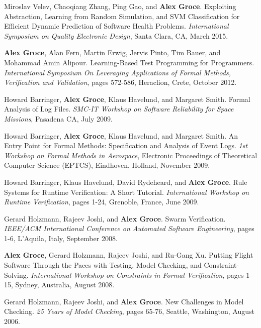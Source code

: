 \documentclass[ComputerScience]{vita}
\begin{document}
\begin{vita}
\begin{Invited Papers}
\item Miroslav Velev, Chaoqiang Zhang, Ping Gao, and {\bf Alex Groce}.
\newblock Exploiting Abstraction, Learning from Random Simulation, and SVM Classification for Efficient Dynamic Prediction of Software Health Problems.
\newblock \emph{International Symposium on Quality Electronic Design}, Santa Clara, CA, March 2015.

\item {\bf Alex Groce}, Alan Fern, Martin Erwig, Jervis Pinto, Tim Bauer, and Mohammad Amin Alipour.
\newblock Learning-Based Test Programming for Programmers.
\newblock \emph{International Symposium On Leveraging Applications of Formal Methods, Verification and Validation}, pages 572-586, Heraclion, Crete, October 2012.


\item Howard Barringer, {\bf Alex Groce}, Klaus Havelund, and Margaret Smith.
\newblock Formal Analysis of Log Files.
\newblock \emph{SMC-IT Workshop on Software Reliability for Space Missions}, Pasadena CA, July 2009.


\item Howard Barringer, {\bf Alex Groce}, Klaus Havelund, and Margaret Smith.
\newblock An Entry Point for Formal Methods:  Specification and Analysis of Event Logs.
\newblock \emph{1st Workshop on Formal Methods in Aerospace}, Electronic Proceedings of Theoretical Computer Science (EPTCS), Eindhoven, Holland, November 2009.

\item Howard Barringer, Klaus Havelund, David Rydeheard, and {\bf Alex Groce}.
\newblock Rule Systems for Runtime Verification: A Short Tutorial.
\newblock \emph{International Workshop on Runtime Verification}, pages 1-24, Grenoble, France, June 2009.

\item Gerard Holzmann, Rajeev Joshi, and {\bf Alex Groce}.
\newblock Swarm Verification.
\newblock \emph{IEEE/ACM International Conference on Automated Software Engineering}, pages 1-6, L'Aquila, Italy, September 2008.

\item {\bf Alex Groce}, Gerard Holzmann, Rajeev Joshi, and Ru-Gang Xu.
\newblock Putting Flight Software Through the Paces with Testing, Model Checking, and Constraint-Solving.
\newblock \emph{International Workshop on Constraints in Formal Verification}, pages 1-15, Sydney, Australia, August 2008.

\item
Gerard Holzmann, Rajeev Joshi, and {\bf Alex Groce}.
\newblock New Challenges in Model Checking.
\newblock \emph
{25 Years of Model Checking}, pages 65-76, Seattle, Washington, August 2006.
\end{Invited Papers}


\end{vita}
\end{document}
